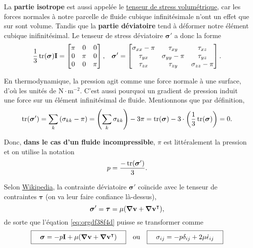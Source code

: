 \documentclass[10pt]{article}
\numberwithin{equation}{section}
\newcommand{\vv}{\vb{v}}
\newcommand{\tall}{\vphantom{pA^{x^x}_p}}
\begin{document}
La \textbf{partie isotrope} est aussi appelée le \href{https://en.wikipedia.org/wiki/Cauchy\_stress\_tensor}{tenseur de stress volumétrique}, car les forces normales à notre parcelle de fluide cubique infinitésimale n'ont un effet que sur sont volume.
Tandis que la \textbf{partie déviatoire} tend à déformer notre élément cubique inifinitésimal.
Le tenseur de stress déviatoire \(\boldsymbol{\sigma}'\) a donc la forme
\begin{align}
   &&\frac{1}{3} \trace(\boldsymbol{\sigma})\mathbf{I} =    \begin{bmatrix}
     \pi & 0 & 0 \\
     0 & \pi & 0 \\
     0 & 0 & \pi \\
   \end{bmatrix},
   &&\boldsymbol{\sigma}' =    \begin{bmatrix}
     \sigma_{xx}-\pi & \tau_{xy} & \tau_{xz} \\
     \tau_{yx} & \sigma_{yy}-\pi & \tau_{yz} \\
     \tau_{zx} & \tau_{zy} & \sigma_{zz}-\pi \\
   \end{bmatrix}.&&
\end{align}


En thermodynamique, la pression agit comme une force normale à une surface, d'où les unités de \(\mathrm{N}\cdot\mathrm{m}^{-2}\).
C'est aussi pourquoi un gradient de pression induit une force sur un élément infinitésimal de fluide.
Mentionnons que par définition,
\begin{equation}
\label{eq:org0b697bd}
   \trace(\boldsymbol{\sigma}') = \sum_k \qty(\sigma_{kk} - \pi) = \qty(\sum_k \sigma_{kk}) - 3\pi = \trace(\boldsymbol{\sigma}) - 3\cdot\qty(\frac{1}{3}\trace(\boldsymbol{\sigma})) = 0.
\end{equation}


Donc, \textbf{dans le cas d'un fluide incompressible}, \(\pi\) est littéralement la pression et on utilise la notation
\begin{equation}
   p = \frac{-\trace(\boldsymbol{\sigma}')}{3}.
\end{equation}

Selon \href{https://en.wikipedia.org/wiki/Newtonian\_fluid\#Newtonian\_law\_of\_viscosity}{Wikipedia}, la contrainte déviatoire \(\boldsymbol{\sigma}'\) coïncide avec le tenseur de contraintes \(\boldsymbol{\tau}\) (on va leur faire confiance là-dessus), 
\begin{equation}
   \boldsymbol{\sigma}' = \boldsymbol{\tau} = \mu \qty(\gradient{\vv} + \gradient{\vv}^\intercal),
\end{equation}
de sorte que l'éqation \ref{eq:orgdf38f4d} puisse se transformer comme
\begin{align}
\label{eq:org3002490}
   &&\boxed{\quad\tall\boldsymbol{\sigma} = -p \mathbf{I} + \mu \qty(\gradient{\vv} + \gradient{\vv}^\intercal)\quad}
   &&\text{ou}
   &&\boxed{\quad\sigma_{ij} = -p\delta_{ij} + 2\mu\dot{\epsilon}_{ij}\quad\tall}&&
\end{align}
\end{document}
